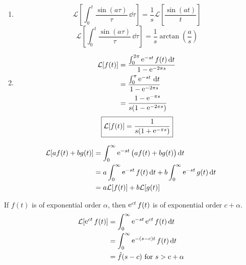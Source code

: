 {\begin{Solution}
\begin{enumerate}
\[{      }
    \]
  \item
    \[
    \mathcal{L} \left[ \int_0^t \frac{ \sin(a \tau) }{ \tau } \,\dd \tau \right]
    = \frac{1}{s} \mathcal{L} \left[ \frac{ \sin(a t) }{ t } \right]
    \]
    \[
    \boxed{
      \mathcal{L} \left[ \int_0^t \frac{ \sin(a \tau) }{ \tau } \,\dd \tau \right]
      = \frac{1}{s} \arctan \left( \frac{ a }{ s } \right)
      }
    \]
  \item
    \begin{align*}
      \mathcal{L}[ f(t) ]
      &= \frac{ \int_0^{2\pi} \mathop{\mathrm{e}}\nolimits^{-s t} f(t) \,\mathrm{d} t }{ 1 - \mathop{\mathrm{e}}\nolimits^{-2 \pi s} } \\
      &= \frac{ \int_0^\pi \mathop{\mathrm{e}}\nolimits^{-s t} \,\mathrm{d} t }{ 1 - \mathop{\mathrm{e}}\nolimits^{-2 \pi s} } \\
      &= \frac{ 1 - \mathop{\mathrm{e}}\nolimits^{- \pi s}}{ s ( 1 - \mathop{\mathrm{e}}\nolimits^{-2 \pi s} ) } 
    \end{align*}
    \[
    \boxed{
      \mathcal{L}[ f(t) ] = \frac{ 1 }{ s ( 1 + \mathop{\mathrm{e}}\nolimits^{- \pi s} ) }
      }
    \]
  \end{enumerate}
\end{Solution}







\begin{Solution} %
  \label{solution L(a f + b g) = a L(f) + b L(g)}
  \begin{align*}
    \mathcal{L}[a f(t) + b g(t)] 
    &= \int_0^\infty \mathop{\mathrm{e}}\nolimits^{-s t} \big(a f(t) + b g(t)\big)\,\mathrm{d} t \\
    &= a \int_0^\infty \mathop{\mathrm{e}}\nolimits^{-s t} f(t)\,\mathrm{d} t 
    + b \int_0^\infty \mathop{\mathrm{e}}\nolimits^{-s t} g(t)\,\mathrm{d} t \\
    &= a \mathcal{L}[f(t)] + b \mathcal{L}[g(t)]
  \end{align*}
\end{Solution}








\begin{Solution} %
  \label{solution L(e c t f) = F(s-c)}
  If $f(t)$ is of exponential order $\alpha$, then $\mathop{\mathrm{e}}\nolimits^{c t} f(t)$ is of 
  exponential order $c + \alpha$.
  \begin{align*}
    \mathcal{L}[\mathop{\mathrm{e}}\nolimits^{c t} f(t)]
    &= \int_0^\infty \mathop{\mathrm{e}}\nolimits^{-s t} \mathop{\mathrm{e}}\nolimits^{c t} f(t)\,\mathrm{d} t \\
    &= \int_0^\infty \mathop{\mathrm{e}}\nolimits^{-(s-c) t} f(t)\,\mathrm{d} t \\
    &= \hat{f}(s-c)\ \mathrm{for}\ s > c + \alpha
  \end{align*}
\end{Solution}




}

